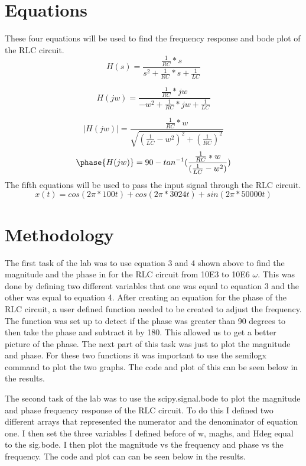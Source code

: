 \documentclass[11pt,a4]{report}
\begin{document}
\section{Equations}
These four equations will be used to find the frequency response and bode plot of the RLC circuit.
\begin{equation}
    H(s) = \frac{\frac{1}{RC}*s}{s^2+\frac{1}{RC}*s+\frac{1}{LC}}
\end{equation}

\begin{equation}
    H(jw) = \frac{\frac{1}{RC}*jw}{-w^2+\frac{1}{RC}*jw+\frac{1}{LC}}
\end{equation}

\begin{equation}
    |H(jw)| = \frac{\frac{1}{RC}*w}{\sqrt{(\frac{1}{LC}-w^2)^2+(\frac{1}{RC})^2}}
\end{equation}\begin{equation}
   \phase{H(jw)}  = 90 - tan^{-1}(\frac{\frac{1}{RC}*w}{(\frac{1}{LC}-w^2)})
\end{equation}
The fifth equations will be used to pass the input signal through the RLC circuit.
\begin{equation}
    x(t) = cos(2\pi*100t)+cos(2\pi*3024t)+sin(2\pi*50000t)
\end{equation}

\section{Methodology}
The first task of the lab was to use equation 3 and 4 shown above to find the magnitude and the phase in for the RLC circuit from 10E3 to 10E6 $\omega$. This was done by defining two different variables that one was equal to equation 3 and the other was equal to equation 4. After creating an equation for the phase of the RLC circuit, a user defined function needed to be created to adjust the frequency. The function was set up to detect if the phase was greater than 90 degrees to then take the phase and subtract it by 180. This allowed us to get a better picture of the phase. The next part of this task was just to plot the magnitude and phase. For these two functions it was important to use the semilogx command to plot the two graphs. The code and plot of this can be seen below in the results.  

The second task of the lab was to use the scipy.signal.bode to plot the magnitude and phase frequency response of the RLC circuit. To do this I defined two different arrays that represented the numerator and the denominator of equation one. I then set the three variables I defined before of w, maghs, and Hdeg equal to the sig.bode. I then plot the magnitude vs the frequency and phase vs the frequency. The code and plot can can be seen below in the results. 
\end{document}
